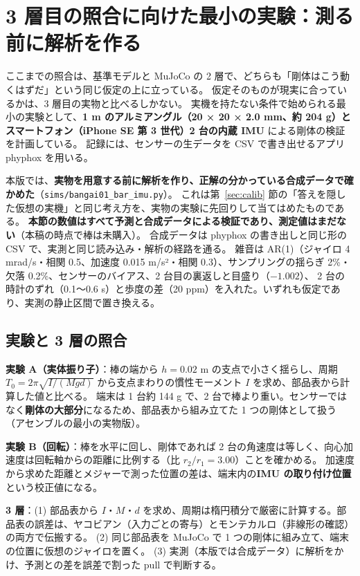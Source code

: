 \documentclass[paper=a4paper,fontsize=10pt,twocolumn,column_gap=2zw,line_length=24zw,number_of_lines=46,head_space=20mm]{jlreq}
\begin{document}
\section{3 層目の照合に向けた最小の実験：測る前に解析を作る}\label{sec:bangai}

ここまでの照合は、基準モデルと MuJoCo の 2 層で、どちらも「剛体はこう動くはずだ」という同じ仮定の上に立っている。
仮定そのものが現実に合っているかは、3 層目の実物と比べるしかない。
実機を持たない条件で始められる最小の実験として、\textbf{1 m のアルミアングル（20 × 20 × 2.0 mm、約 204 g）とスマートフォン（iPhone SE 第 3 世代）2 台の内蔵 IMU} による剛体の検証を計画している。
記録には、センサーの生データを CSV で書き出せるアプリ phyphox \cite{phyphox} を用いる。

本版では、\textbf{実物を用意する前に解析を作り、正解の分かっている合成データで確かめた}（\texttt{sims/bangai01\_bar\_imu.py}）。
これは第~\ref{sec:calib} 節の「答えを隠した仮想の実機」と同じ考え方を、実物の実験に先回りして当てはめたものである。
\textbf{本節の数値はすべて予測と合成データによる検証であり、測定値はまだない}（本稿の時点で棒は未購入）。
合成データは phyphox の書き出しと同じ形の CSV で、実測と同じ読み込み・解析の経路を通る。
雑音は AR(1)（ジャイロ 4 mrad/s・相関 0.5、加速度 0.015 m/s²・相関 0.3）、サンプリングの揺らぎ 2\%・欠落 0.2\%、センサーのバイアス、2 台目の裏返しと目盛り（$-1.002$）、
2 台の時計のずれ（0.1〜0.6 s）と歩度の差（20 ppm）を入れた。いずれも仮定であり、実測の静止区間で置き換える。

\subsection{実験と 3 層の照合}

\textbf{実験 A（実体振り子）}：棒の端から $h=0.02$ m の支点で小さく揺らし、周期 $T_0=2\pi\sqrt{I/(Mgd)}$ から支点まわりの慣性モーメント $I$ を求め、部品表から計算した値と比べる。
端末は 1 台約 144 g で、2 台で棒より重い。センサーではなく\textbf{剛体の大部分}になるため、部品表から組み立てた 1 つの剛体として扱う（アセンブルの最小の実物版）。

\textbf{実験 B（回転）}：棒を水平に回し、剛体であれば 2 台の角速度は等しく、向心加速度は回転軸からの距離に比例する（比 $r_2/r_1 = 3.00$）ことを確かめる。
加速度から求めた距離とメジャーで測った位置の差は、端末内の\textbf{IMU の取り付け位置}という校正値になる。

\textbf{3 層}：(1) 部品表から $I$・$M$・$d$ を求め、周期は楕円積分で厳密に計算する。部品表の誤差は、ヤコビアン（入力ごとの寄与）とモンテカルロ（非線形の確認）の両方で伝搬する。
(2) 同じ部品表を MuJoCo で 1 つの剛体に組み立て、端末の位置に仮想のジャイロを置く。
(3) 実測（本版では合成データ）に解析をかけ、予測との差を誤差で割った pull で判断する。
\end{document}
